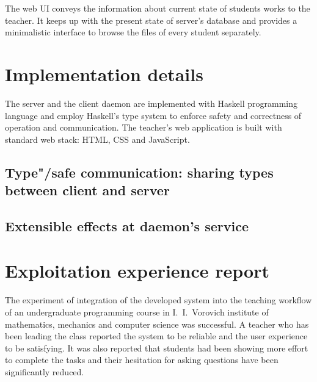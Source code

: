 The web UI conveys the information about current state of students works to the teacher.
It keeps up with the present state of server's database and provides a minimalistic
interface to browse the files of every student separately.

\section{Implementation details}

The server and the client daemon are implemented with Haskell programming language
and employ Haskell's type system to enforce safety and correctness of operation
and communication. The teacher's web application is built with standard web stack:
HTML, CSS and JavaScript.

\subsection{Type"/safe communication: sharing types between client and server}

\subsection{Extensible effects at daemon's service}

\section{Exploitation experience report}

The experiment of integration of the developed system into the teaching workflow
of an undergraduate programming course in I.~I.~Vorovich institute of mathematics,
mechanics and computer science was successful. A teacher who has been leading the
class reported the system to be reliable and the user experience to be satisfying.
It was also reported that students had been showing more effort to complete the
tasks and their hesitation for asking questions have been significantly reduced.
